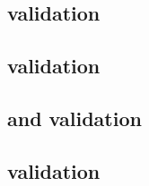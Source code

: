 \begin{sbmlenum}

\end{sbmlenum} \subsection*{ validation} \begin{sbmlenum}


\end{sbmlenum} \subsection*{ validation} \begin{sbmlenum}


\begin{blockChanged}


\end{blockChanged}

\end{sbmlenum} \subsection*{ and  validation} \begin{sbmlenum}


\begin{blockChanged}


\end{blockChanged}

\end{sbmlenum} \subsection*{ validation} \begin{sbmlenum}



\end{sbmlenum}
